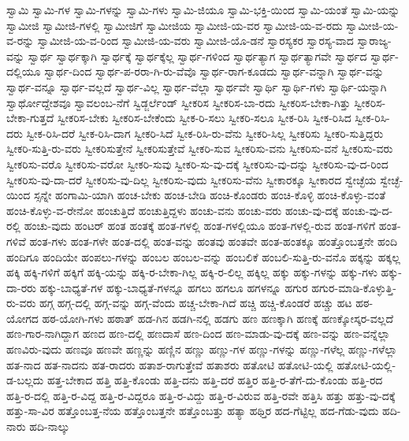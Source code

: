 {ಸ್ವಾಮಿ
ಸ್ವಾಮಿ-ಗಳ
ಸ್ವಾಮಿ-ಗಳನ್ನು
ಸ್ವಾಮಿ-ಗಳು
ಸ್ವಾಮಿ-ಜಿಯೂ
ಸ್ವಾಮಿ-ಭಕ್ತಿ-ಯಿಂದ
ಸ್ವಾಮಿ-ಯಂತೆ
ಸ್ವಾಮಿ-ಯನ್ನು
ಸ್ವಾಮೀಜಿ
ಸ್ವಾಮೀಜಿ-ಗಳಲ್ಲಿ
ಸ್ವಾಮೀಜಿಗೆ
ಸ್ವಾಮೀಜಿಯ
ಸ್ವಾಮೀಜಿ-ಯ-ವರ
ಸ್ವಾಮೀಜಿ-ಯ-ವ-ರದು
ಸ್ವಾಮೀಜಿ-ಯ-ವ-ರನ್ನು
ಸ್ವಾಮೀಜಿ-ಯ-ವ-ರಿಂದ
ಸ್ವಾಮೀಜಿ-ಯ-ವರು
ಸ್ವಾಮೀಜಿ-ಯೊ-ಡನೆ
ಸ್ವಾರಸ್ಯಕರ
ಸ್ವಾರಸ್ಯ-ವಾದ
ಸ್ವಾರಾಜ್ಯ-ವನ್ನು
ಸ್ವಾರ್ಥ
ಸ್ವಾರ್ಥಕ್ಕಾಗಿ
ಸ್ವಾರ್ಥಕ್ಕೆ
ಸ್ವಾರ್ಥಕ್ಕೆಲ್ಲ
ಸ್ವಾರ್ಥ-ಗಳಿಂದ
ಸ್ವಾರ್ಥತ್ಯಾಗ
ಸ್ವಾರ್ಥತ್ಯಾಗವೇ
ಸ್ವಾರ್ಥದ
ಸ್ವಾರ್ಥ-ದಲ್ಲಿಯೂ
ಸ್ವಾರ್ಥ-ದಿಂದ
ಸ್ವಾರ್ಥ-ಪ-ರರಾ-ಗಿ-ರು-ವೆವೊ
ಸ್ವಾರ್ಥ-ರಾಗ-ಕೂಡದು
ಸ್ವಾರ್ಥ-ವನ್ನಾಗಿ
ಸ್ವಾರ್ಥ-ವನ್ನು
ಸ್ವಾರ್ಥ-ವನ್ನೂ
ಸ್ವಾರ್ಥ-ವಲ್ಲದೆ
ಸ್ವಾರ್ಥ-ವಿಲ್ಲ
ಸ್ವಾರ್ಥ-ವೆಲ್ಲಾ
ಸ್ವಾರ್ಥವೇ
ಸ್ವಾರ್ಥಿ
ಸ್ವಾರ್ಥಿ-ಗಳು
ಸ್ವಾರ್ಥಿ-ಯನ್ನಾಗಿ
ಸ್ವಾರ್ಥೋದ್ದೇಶವೂ
ಸ್ವಾವಲಂಬ-ನೆಗೆ
ಸ್ವಿಡ್ಜರ್ಲೆಂಡ್
ಸ್ವೀಕರಿಸ
ಸ್ವೀಕರಿಸ-ಬಾ-ರದು
ಸ್ವೀಕರಿಸ-ಬೇಕಾ-ಗಿತ್ತು
ಸ್ವೀಕರಿಸ-ಬೇಕಾ-ಗುತ್ತದೆ
ಸ್ವೀಕರಿಸ-ಬೇಕು
ಸ್ವೀಕರಿಸ-ಬೇಕೆಂದು
ಸ್ವೀಕ-ರಿ-ಸಲು
ಸ್ವೀಕರಿ-ಸಲೂ
ಸ್ವೀಕ-ರಿಸಿ
ಸ್ವೀಕ-ರಿಸಿದ
ಸ್ವೀಕ-ರಿಸಿ-ದರು
ಸ್ವೀಕ-ರಿಸಿ-ದರೆ
ಸ್ವೀಕ-ರಿಸಿ-ದಾಗ
ಸ್ವೀಕರಿ-ಸಿದೆ
ಸ್ವೀಕ-ರಿಸಿ-ರು-ವೆನು
ಸ್ವೀಕರಿ-ಸಿಲ್ಲ
ಸ್ವೀಕರಿಸು
ಸ್ವೀಕರಿ-ಸುತ್ತಿದ್ದರು
ಸ್ವೀಕರಿ-ಸುತ್ತಿ-ರು-ವರು
ಸ್ವೀಕರಿಸುತ್ತೇನೆ
ಸ್ವೀಕರಿಸುತ್ತೇವೆ
ಸ್ವೀಕರಿ-ಸುವ
ಸ್ವೀಕರಿಸು-ವನು
ಸ್ವೀಕರಿಸು-ವನೆ
ಸ್ವೀಕರಿಸು-ವರು
ಸ್ವೀಕರಿಸು-ವರೊ
ಸ್ವೀಕರಿಸು-ವರೋ
ಸ್ವೀಕರಿ-ಸುವು
ಸ್ವೀಕರಿ-ಸು-ವು-ದಕ್ಕೆ
ಸ್ವೀಕರಿಸು-ವು-ದನ್ನು
ಸ್ವೀಕರಿಸು-ವು-ದ-ರಿಂದ
ಸ್ವೀಕರಿಸು-ವು-ದಾ-ದರೆ
ಸ್ವೀಕರಿಸು-ವು-ದಿಲ್ಲ
ಸ್ವೀಕರಿಸು-ವುದು
ಸ್ವೀಕರಿಸು-ವೆನು
ಸ್ವೀಕಾರಕ್ಕೂ
ಸ್ವೀಕಾರದ
ಸ್ವೇಚ್ಛೆಯ
ಸ್ವೇಚ್ಛೆ-ಯಿಂದ
ಸ್ಸನ್ನೇ
ಹಂಗಾಮಿ-ಯಾಗಿ
ಹಂಚ-ಬೇಕು
ಹಂಚ-ಬೇಡಿ
ಹಂಚಿ-ಕೊಂಡರು
ಹಂಚಿ-ಕೊಳ್ಳಿ
ಹಂಚಿ-ಕೊಳ್ಳು-ವಂತೆ
ಹಂಚಿ-ಕೊಳ್ಳು-ವ-ರೇನೋ
ಹಂಚುತ್ತಿದೆ
ಹಂಚುತ್ತಿದ್ದಳು
ಹಂಚು-ವನು
ಹಂಚು-ವರು
ಹಂಚು-ವು-ದಕ್ಕೆ
ಹಂಚು-ವು-ದ-ರಲ್ಲಿ
ಹಂಚು-ವುದು
ಹಂಟರ್
ಹಂತ
ಹಂತಕ್ಕೆ
ಹಂತ-ಗಳಲ್ಲಿ
ಹಂತ-ಗಳಲ್ಲಿಯೂ
ಹಂತ-ಗಳಲ್ಲಿ-ರುವ
ಹಂತ-ಗಳಿಗೆ
ಹಂತ-ಗಳಿವೆ
ಹಂತ-ಗಳು
ಹಂತ-ಗಳೇ
ಹಂತ-ದಲ್ಲಿ
ಹಂತ-ವನ್ನು
ಹಂತವು
ಹಂತವೇ
ಹಂತ-ಹಂತಕ್ಕೂ
ಹಂತ್ತೊಂಬತ್ತನೇ
ಹಂದಿ
ಹಂದಿಗೂ
ಹಂದಿಯೇ
ಹಂಪಲು-ಗಳನ್ನು
ಹಂಬಲ
ಹಂಬಲ-ವನ್ನು
ಹಂಬಲಿಕೆ
ಹಂಬಲಿ-ಸುತ್ತಿ-ರು-ವನೊ
ಹಕ್ಕನ್ನು
ಹಕ್ಕಲ್ಲ
ಹಕ್ಕಿ
ಹಕ್ಕಿ-ಗಳಿಗೆ
ಹಕ್ಕಿಗೆ
ಹಕ್ಕಿ-ಯನ್ನು
ಹಕ್ಕಿ-ರ-ಬೇಕಾ-ಗಿಲ್ಲ
ಹಕ್ಕಿ-ರ-ಲಿಲ್ಲ
ಹಕ್ಕಿಲ್ಲ
ಹಕ್ಕು
ಹಕ್ಕು-ಗಳನ್ನು
ಹಕ್ಕು-ಗಳು
ಹಕ್ಕು-ದಾ-ರರು
ಹಕ್ಕು-ಬಾಧ್ಯತೆ-ಗಳ
ಹಕ್ಕು-ಬಾಧ್ಯತೆ-ಗಳನ್ನೂ
ಹಗಲು
ಹಗಲೂ
ಹಗಳನ್ನೂ
ಹಗುರ
ಹಗುರ-ಮಾಡಿ-ಕೊಳ್ಳುತ್ತಿ-ರು-ವರು
ಹಗ್ಗ
ಹಗ್ಗ-ದಲ್ಲಿ
ಹಗ್ಗ-ವನ್ನು
ಹಗ್ಗ-ವೆಂದು
ಹಚ್ಚ-ಬೇಕಾ-ಗಿದೆ
ಹಚ್ಚಿ
ಹಚ್ಚಿ-ಕೊಂಡರೆ
ಹಚ್ಚು
ಹಟ
ಹಠ-ಯೋಗದ
ಹಠ-ಯೋಗಿ-ಗಳು
ಹಠಾತ್
ಹಡ-ಗಿನ
ಹಡಗಿ-ನಲ್ಲಿ
ಹಡಗು
ಹಣ
ಹಣಕ್ಕಾಗಿ
ಹಣಕ್ಕೆ
ಹಣಕ್ಕೋಸ್ಕರ-ವಲ್ಲದೆ
ಹಣ-ಗಾರ-ನಾಗಿದ್ದಾಗ
ಹಣದ
ಹಣ-ದಲ್ಲಿ
ಹಣದಾಸೆ
ಹಣ-ದಿಂದ
ಹಣ-ಮಾಡು-ವು-ದಕ್ಕೆ
ಹಣ-ವನ್ನು
ಹಣ-ವನ್ನೆಲ್ಲಾ
ಹಣವಿರು-ವುದು
ಹಣವೂ
ಹಣವೇ
ಹಣ್ಣನ್ನು
ಹಣ್ಣಿನ
ಹಣ್ಣು
ಹಣ್ಣು-ಗಳ
ಹಣ್ಣು-ಗಳನ್ನು
ಹಣ್ಣು-ಗಳೆಲ್ಲ
ಹಣ್ಣು-ಗಳೆಲ್ಲಾ
ಹತ-ನಾದ
ಹತ-ನಾದನು
ಹತ-ರಾದರು
ಹತಾಶ-ರಾಗುತ್ತೇವೆ
ಹತಾಶರು
ಹತೋಟಿ
ಹತೋಟಿ-ಯಲ್ಲಿ
ಹತೋಟಿ-ಯಲ್ಲಿ-ಡ-ಬಲ್ಲದು
ಹತ್ತ-ಬೇಕಾದ
ಹತ್ತಿ
ಹತ್ತಿ-ಕೊಂಡು
ಹತ್ತಿ-ದನು
ಹತ್ತಿ-ದರೆ
ಹತ್ತಿರ
ಹತ್ತಿ-ರ-ತೆಗೆ-ದು-ಕೊಂಡು
ಹತ್ತಿ-ರದ
ಹತ್ತಿ-ರ-ದಲ್ಲಿ
ಹತ್ತಿ-ರ-ವಿದ್ದ
ಹತ್ತಿ-ರ-ವಿದ್ದರೂ
ಹತ್ತಿ-ರ-ವಿದ್ದು
ಹತ್ತಿ-ರ-ವಿರುವ
ಹತ್ತಿ-ರವೇ
ಹತ್ತಿಸಿ
ಹತ್ತು
ಹತ್ತು-ವು-ದಕ್ಕೆ
ಹತ್ತು-ಸಾ-ವಿರ
ಹತ್ತೊಂಬತ್ತ-ನೆಯ
ಹತ್ತೊಂಬತ್ತನೇ
ಹತ್ತೊಂಬತ್ತು
ಹತ್ಯಾ
ಹಥ್ತಿರ
ಹದ-ಗೆಟ್ಟಿಲ್ಲ
ಹದ-ಗೆಡು-ವುದು
ಹದಿ-ನಾರು
ಹದಿ-ನಾಲ್ಕು
}
